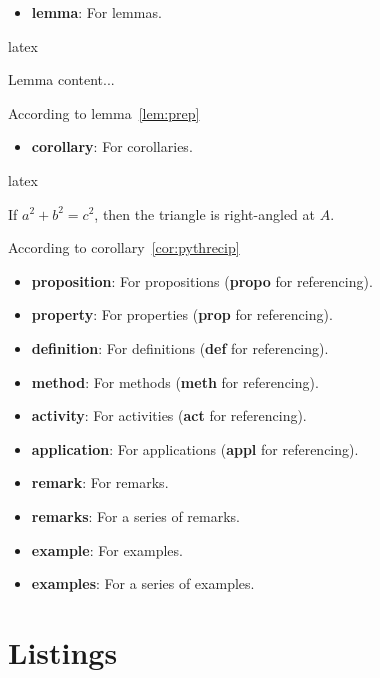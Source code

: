 \documentclass[
    margin=2cm
]{neoschool}
\begin{document}
\begin{itemize}
\item
  \textbf{lemma}: For lemmas.
\end{itemize}

\begin{code}{latex}
\begin{lemma}[title=Preparatory Lemma,label=prep]
    Lemma content...
\end{lemma}

According to lemma~\ref{lem:prep}
\end{code}

\begin{itemize}
\item
  \textbf{corollary}: For corollaries.
\end{itemize}

\begin{code}{latex}
\begin{corollary}[
    title=Pythagorean Converse,
    label=pythrecip
]
    If $a^2 + b^2 = c^2$, then the triangle is
    right-angled at $A$.
\end{corollary}

According to corollary~\ref{cor:pythrecip}
\end{code}

\begin{itemize}
\item
  \textbf{proposition}: For propositions (\textbf{propo} for
  referencing).
\item
  \textbf{property}: For properties (\textbf{prop} for referencing).
\item
  \textbf{definition}: For definitions (\textbf{def} for referencing).
\item
  \textbf{method}: For methods (\textbf{meth} for referencing).
\item
  \textbf{activity}: For activities (\textbf{act} for referencing).
\item
  \textbf{application}: For applications (\textbf{appl} for
  referencing).
\item
  \textbf{remark}: For remarks.
\item
  \textbf{remarks}: For a series of remarks.
\item
  \textbf{example}: For examples.
\item
  \textbf{examples}: For a series of examples.
\end{itemize}

\section{Listings}
\end{document}
